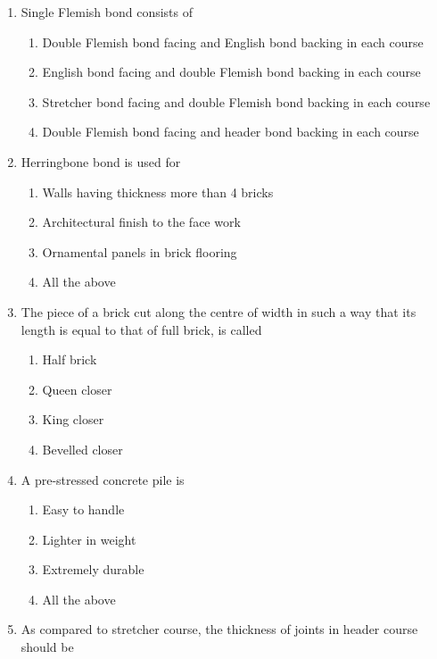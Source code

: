\documentclass[11pt,a4paper]{article}
\begin{document}
\begin{enumerate}
\item{Single Flemish bond consists of}
\begin{enumerate}[label=\Alph*.]
\item{Double Flemish bond facing and English bond backing in each course}
\item{English bond facing and double Flemish bond backing in each course}
\item{Stretcher bond facing and double Flemish bond backing in each course}
\item{Double Flemish bond facing and header bond backing in each course}
\end{enumerate}
\item{Herringbone bond is used for}
\begin{enumerate}[label=\Alph*.]
\item{Walls having thickness more than 4 bricks}
\item{Architectural finish to the face work}
\item{Ornamental panels in brick flooring}
\item{All the above}
\end{enumerate}
\item{The piece of a brick cut along the centre of width in such a way that its length is equal to that of full brick, is called}
\begin{enumerate}[label=\Alph*.]
\item{Half brick}
\item{Queen closer}
\item{King closer}
\item{Bevelled closer}
\end{enumerate}
\item{A pre-stressed concrete pile is}
\begin{enumerate}[label=\Alph*.]
\item{Easy to handle}
\item{Lighter in weight}
\item{Extremely durable}
\item{All the above}
\end{enumerate}
\item{As compared to stretcher course, the thickness of joints in header course should be}

\end{enumerate}
\end{document}
